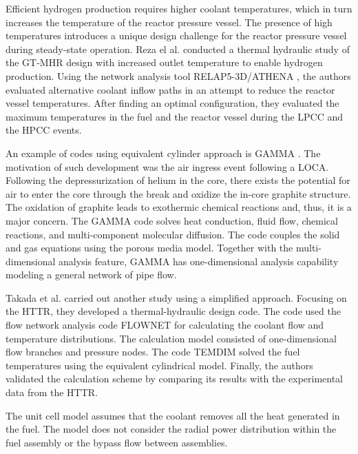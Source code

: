 \documentclass[11pt,letterpaper]{article}
\begin{document}
Efficient hydrogen production requires higher coolant temperatures, which in turn increases the temperature of the reactor pressure vessel.
The presence of high temperatures introduces a unique design challenge for the reactor pressure vessel during steady-state operation.
Reza el al. \cite{reza_design_2006} conducted a thermal hydraulic study of the GT-MHR design \cite{general_atomics_gas_1996} with increased outlet temperature to enable hydrogen production.
Using the network analysis tool RELAP5-3D/ATHENA \cite{inl_relap5-3dathena_2005}, the authors evaluated alternative coolant inflow paths in an attempt to reduce the reactor vessel temperatures.
After finding an optimal configuration, they evaluated the maximum temperatures in the fuel and the reactor vessel during the \gls{LPCC} and the \gls{HPCC} events.

An example of codes using equivalent cylinder approach is GAMMA \cite{no_multi-component_2007}.
The motivation of such development was the air ingress event following a LOCA.
Following the depressurization of helium in the core, there exists the potential for air to enter the core through the break and oxidize the in-core graphite structure.
The oxidation of graphite leads to exothermic chemical reactions and, thus, it is a major concern.
The GAMMA code solves heat conduction, fluid flow, chemical reactions, and multi-component molecular diffusion.
The code couples the solid and gas equations using the porous media model.
Together with the multi-dimensional analysis feature, GAMMA has one-dimensional analysis capability modeling a general network of pipe flow.

Takada et al. \cite{takada_core_2004} carried out another study using a simplified approach.
Focusing on the \gls{HTTR}, they developed a thermal-hydraulic design code.
The code used the flow network analysis code FLOWNET for calculating the coolant flow and temperature distributions.
The calculation model consisted of one-dimensional flow branches and pressure nodes.
The code TEMDIM solved the fuel temperatures using the equivalent cylindrical model.
Finally, the authors validated the calculation scheme by comparing its results with the experimental data from the \gls{HTTR}.

The unit cell model assumes that the coolant removes all the heat generated in the fuel.
The model does not consider the radial power distribution within the fuel assembly or the bypass flow between assemblies.
\end{document}
